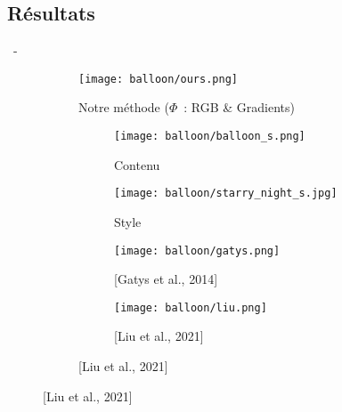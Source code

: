 \documentclass[aspectratio=169, 22pt]{beamer}
\begin{document}
\subsection{Résultats}
\begin{frame}{\secname~- \subsecname}
  \begin{figure}
    \begin{subfigure}{0.47\linewidth}
      \texttt{[image: balloon/ours.png]}
      \caption{Notre méthode ($\Phi$ : RGB \& Gradients)}
    \end{subfigure}
    \begin{subfigure}{0.45\linewidth}
      \begin{subfigure}{0.45\linewidth}
        \texttt{[image: balloon/balloon\_s.png]}
        \caption{Contenu}
      \end{subfigure}
      \begin{subfigure}{0.45\linewidth}
        \texttt{[image: balloon/starry\_night\_s.jpg]}
        \caption{Style}
      \end{subfigure}

      \begin{subfigure}{0.45\linewidth}
        \texttt{[image: balloon/gatys.png]}
        \caption{\scriptsize [Gatys et al., 2014]}
      \end{subfigure}
      \begin{subfigure}{0.45\linewidth}
        \texttt{[image: balloon/liu.png]}
        \caption{[Liu et al., 2021]}
      \end{subfigure}
    \end{subfigure}
  \end{figure}
\end{frame}
\end{document}
